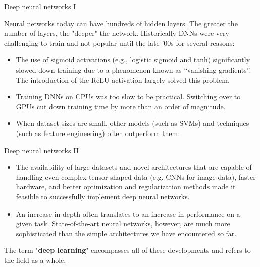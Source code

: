 \documentclass[11pt,compress,t,notes=noshow, xcolor=table]{beamer}
\begin{document}
\begin{framei}{Deep neural networks I}

\item Neural networks today can have %
hundreds of hidden layers. The greater the number of layers, the "deeper" the network. Historically %
DNNs were very challenging to train and not popular until the late '00s for several reasons:
\vfill

\begin{itemize}
\item %
The use of sigmoid activations (e.g., logistic sigmoid and tanh) significantly slowed down training due to a phenomenon known as \enquote{vanishing gradients}. The introduction of the ReLU activation largely solved this problem.
\item Training DNNs on CPUs was too slow to be practical. Switching over to GPUs cut down training time by more than an order of magnitude.
\item When dataset sizes are small, other models (such as SVMs) and techniques (such as feature engineering) often outperform them. 
\end{itemize}

\end{framei}

\begin{frame}{Deep neural networks II}

\begin{itemize}
\item The availability of large datasets and novel architectures that are capable of handling even complex tensor-shaped data (e.g. CNNs for image data), faster hardware, and better optimization and regularization methods made it feasible to successfully implement deep neural networks.%

\item An increase in depth often translates to an increase in performance on a given task. State-of-the-art neural networks, however, are much more sophisticated than the simple architectures we have encountered so far.
\end{itemize}

The term "\textbf{deep learning}" encompasses all of these developments and refers to the field as a whole.
\end{frame}

\endlecture
\end{document}
